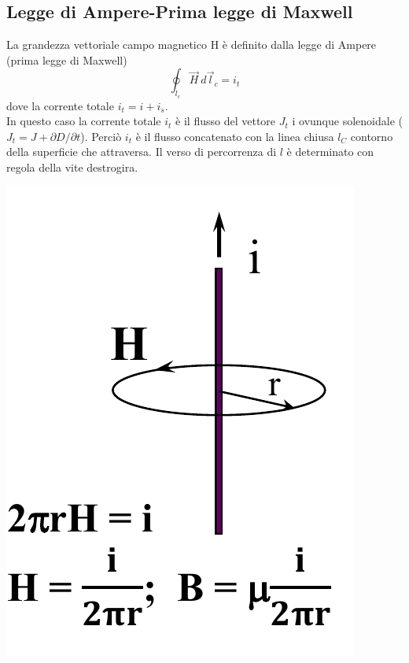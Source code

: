 \documentclass{article}
\begin{document}
\subsection{Legge di Ampere-Prima legge di Maxwell}
La grandezza vettoriale campo magnetico H è definito dalla legge di Ampere (prima legge di Maxwell)
\[
    \oint _{l_c} \vec H \ d \vec l_c = i_t
\]
dove la corrente totale $i_t = i + i_s$.\\
In questo caso la corrente totale $i_t$ è il flusso del vettore $J_t$ i ovunque solenoidale ($J_t = J + \partial D/ \partial t$). Perciò $i_t$ è il flusso concatenato con la linea chiusa $l_C$ contorno della superficie che attraversa. Il verso di percorrenza di $l$ è determinato con regola della vite destrogira.
\begin{center}
    \includegraphics[scale=0.3]{Image/Campo magnetico.png}

\end{center}
\end{document}
